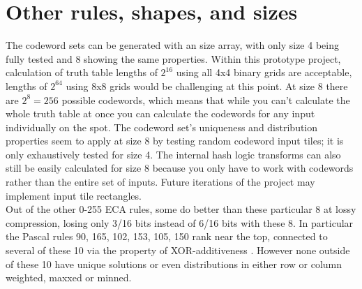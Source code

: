 \documentclass[11pt]{article}
\begin{document}
\section{Other rules, shapes, and sizes}

The codeword sets can be generated with an size array, with only size 4 being fully tested and 8 showing the same properties. Within this prototype project, calculation of truth table lengths of $2^{16}$ using all 4x4 binary grids are acceptable, lengths of $2^{64}$ using 8x8 grids would be challenging at this point. At size 8 there are $2^8=256$ possible codewords, which means that while you can't calculate the whole truth table at once you can calculate the codewords for any input individually on the spot. The codeword set's uniqueness and distribution properties seem to apply at size 8 by testing random codeword input tiles; it is only exhaustively tested for size 4. The internal hash logic transforms can also still be easily calculated for size 8 because you only have to work with codewords rather than the entire set of inputs. Future iterations of the project may implement input tile rectangles.\\

Out of the other 0-255 ECA rules, some do better than these particular 8 at lossy compression, losing only 3/16 bits instead of 6/16 bits with these 8. In particular the Pascal rules 90, 165, 102, 153, 105, 150 rank near the top, connected to several of these 10 via the property of XOR-additiveness \cite{xorAdditive}. However none outside of these 10 have unique solutions or even distributions in either row or column weighted, maxxed or minned.\\



\end{document}
